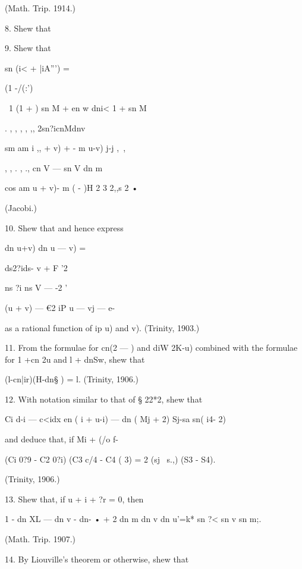 (Math. Trip. 1914.) 



8. Shew that 



9. Shew that 



sn (i< + |iA''') =   



(1 -/(:') 

\  1 (1 +  ) sn M +   en w dni< 
1 +   sn  M 

. , , , , ,, 2sn?icnMdnv 

sm  am i ,, + v) + - m u-v)  j-j   ,~, 

, , . , ., cn  V — sn  V dn  m 

cos  am  u + v)- m ( - )H    2 3 2,,s 2   • 



(Jacobi.) 



10. Shew that 
and hence express 



dn  u+v) dn  u — v) = 



ds2?ids- v + F '2 



ns  ?i ns  V —  -2 ' 

(u + v) — €2 iP  u — vj — e-  



as a rational function of ip u) and   v). (Trinity, 1903.) 

11. From the formulae for cn(2 —  ) and diW  2K-u) combined with the formulae 
for 1 +cn 2u and l + dnSw, shew that 

(l-cn|ir)(H-dn§ ) = l. (Trinity, 1906.) 

12. With notation similar to that of § 22*2, shew that 

Ci d-i — c<idx en ( i + u-i) — dn ( Mj +  2) 
Sj-sa sn( i4- 2) 

and deduce that, if Mi + (/o  f-%

(Ci 0?9 - C2 0?i) (C3 c/4 - C4 ( 3) =  2 (sj \  s.,) (S3 - S4). 

(Trinity, 1906.) 

13. Shew that, if u + i  + ?r = 0, then 

1 - dn  XL — dn  v - dn-  • + 2 dn m dn v dn u'=k* sn  ?< sn  v sn  m;. 

(Math. Trip. 1907.) 

14. By Liouville's theorem or otherwise, shew that 

